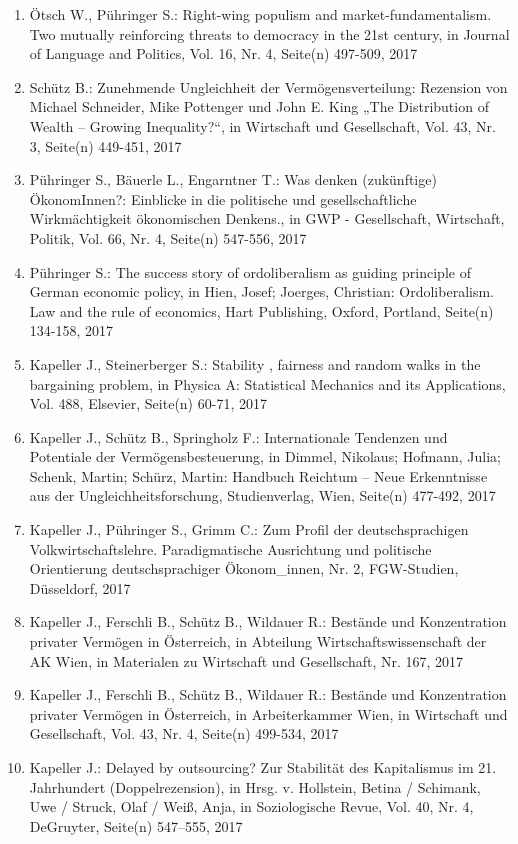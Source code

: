 \begin{enumerate}
    	 \item Ötsch W., Pühringer S.: Right-wing populism and market-fundamentalism. Two mutually reinforcing threats to democracy in the 21st century, in Journal of Language and Politics, Vol. 16, Nr. 4, Seite(n) 497-509, 2017
	 \item Schütz B.: Zunehmende Ungleichheit der Vermögensverteilung: Rezension von Michael Schneider, Mike Pottenger und John E. King „The Distribution of Wealth – Growing Inequality?“, in Wirtschaft und Gesellschaft, Vol. 43, Nr. 3, Seite(n) 449-451, 2017
	 \item Pühringer S., Bäuerle L., Engarntner T.: Was denken (zukünftige) ÖkonomInnen?: Einblicke in die politische und gesellschaftliche Wirkmächtigkeit ökonomischen Denkens., in GWP - Gesellschaft, Wirtschaft, Politik, Vol. 66, Nr. 4, Seite(n) 547-556, 2017
	 \item Pühringer S.: The success story of ordoliberalism as guiding principle of German economic policy, in Hien, Josef; Joerges, Christian: Ordoliberalism. Law and the rule of economics, Hart Publishing, Oxford, Portland, Seite(n) 134-158, 2017
	 \item Kapeller J., Steinerberger S.: Stability , fairness and random walks in the bargaining problem, in Physica A: Statistical Mechanics and its Applications, Vol. 488, Elsevier, Seite(n) 60-71, 2017
	 \item Kapeller J., Schütz B., Springholz F.: Internationale Tendenzen und Potentiale der Vermögensbesteuerung, in Dimmel, Nikolaus; Hofmann, Julia; Schenk, Martin; Schürz, Martin: Handbuch Reichtum – Neue Erkenntnisse aus der Ungleichheitsforschung, Studienverlag, Wien, Seite(n) 477-492, 2017
	 \item Kapeller J., Pühringer S., Grimm C.: Zum Profil der deutschsprachigen Volkwirtschaftslehre. Paradigmatische Ausrichtung und politische Orientierung deutschsprachiger Ökonom_innen, Nr. 2, FGW-Studien, Düsseldorf, 2017
	 \item Kapeller J., Ferschli B., Schütz B., Wildauer R.: Bestände und Konzentration privater Vermögen in Österreich, in Abteilung Wirtschaftswissenschaft der AK Wien, in Materialen zu Wirtschaft und Gesellschaft, Nr. 167, 2017
	 \item Kapeller J., Ferschli B., Schütz B., Wildauer R.: Bestände und Konzentration privater Vermögen in Österreich, in Arbeiterkammer Wien, in Wirtschaft und Gesellschaft, Vol. 43, Nr. 4, Seite(n) 499-534, 2017
	 \item Kapeller J.: Delayed by outsourcing? Zur Stabilität des Kapitalismus im 21. Jahrhundert (Doppelrezension), in Hrsg. v. Hollstein, Betina / Schimank, Uwe / Struck, Olaf / Weiß, Anja, in Soziologische Revue, Vol. 40, Nr. 4, DeGruyter, Seite(n) 547–555, 2017

\end{enumerate}
